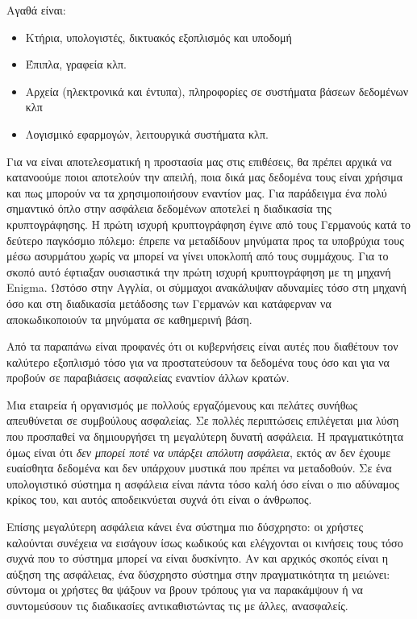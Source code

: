Αγαθά είναι:

\begin{itemize}
\item Κτήρια, υπολογιστές, δικτυακός εξοπλισμός και υποδομή
\item Έπιπλα, γραφεία κλπ.
\item Αρχεία (ηλεκτρονικά και έντυπα), πληροφορίες σε συστήματα βάσεων δεδομένων κλπ
\item Λογισμικό εφαρμογών, λειτουργικά συστήματα κλπ.
\end{itemize}

Για να είναι αποτελεσματική η προστασία μας στις επιθέσεις, θα πρέπει αρχικά να κατανοούμε ποιοι αποτελούν την απειλή, ποια δικά μας δεδομένα τους είναι χρήσιμα και πως μπορούν να τα χρησιμοποιήσουν εναντίον μας. Για παράδειγμα ένα πολύ σημαντικό όπλο στην ασφάλεια δεδομένων αποτελεί η διαδικασία της κρυπτογράφησης. Η πρώτη ισχυρή κρυπτογράφηση έγινε από τους Γερμανούς κατά το δεύτερο παγκόσμιο πόλεμο: έπρεπε να μεταδίδουν μηνύματα προς τα υποβρύχια τους μέσω ασυρμάτου χωρίς να μπορεί να γίνει υποκλοπή από τους συμμάχους. Για το σκοπό αυτό έφτιαξαν ουσιαστικά την πρώτη ισχυρή κρυπτογράφηση με τη μηχανή Enigma. Ωστόσο στην Αγγλία, οι σύμμαχοι ανακάλυψαν αδυναμίες τόσο στη μηχανή όσο και στη διαδικασία μετάδοσης των Γερμανών και κατάφερναν να αποκωδικοποιούν τα μηνύματα σε καθημερινή βάση.

Από τα παραπάνω είναι προφανές ότι οι κυβερνήσεις είναι αυτές που διαθέτουν τον καλύτερο εξοπλισμό τόσο για να προστατεύσουν τα δεδομένα τους όσο και για να προβούν σε παραβιάσεις ασφαλείας εναντίον άλλων κρατών. 

Μια εταιρεία ή οργανισμός με πολλούς εργαζόμενους και πελάτες συνήθως απευθύνεται σε συμβούλους ασφαλείας. Σε πολλές περιπτώσεις επιλέγεται μια λύση που προσπαθεί να δημιουργήσει τη μεγαλύτερη δυνατή ασφάλεια. Η πραγματικότητα όμως είναι ότι \emph{δεν μπορεί ποτέ να υπάρξει απόλυτη ασφάλεια}, εκτός αν δεν έχουμε ευαίσθητα δεδομένα και δεν υπάρχουν μυστικά που πρέπει να μεταδοθούν. Σε ένα υπολογιστικό σύστημα η ασφάλεια είναι πάντα τόσο καλή όσο είναι ο πιο αδύναμος κρίκος του, και αυτός αποδεικνύεται συχνά ότι είναι ο άνθρωπος. 

Επίσης μεγαλύτερη ασφάλεια κάνει ένα σύστημα πιο δύσχρηστο: οι χρήστες καλούνται συνέχεια να εισάγουν ίσως κωδικούς και ελέγχονται οι κινήσεις τους τόσο συχνά που το σύστημα μπορεί να είναι δυσκίνητο. Αν και αρχικός σκοπός είναι η αύξηση της ασφάλειας, ένα δύσχρηστο σύστημα στην πραγματικότητα τη μειώνει: σύντομα οι χρήστες θα ψάξουν να βρουν τρόπους για να παρακάμψουν ή να συντομεύσουν τις διαδικασίες αντικαθιστώντας τις με άλλες, ανασφαλείς.

